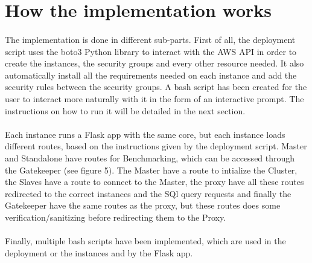 \pagebreak\section{How the implementation works} \label{T1}

\paragraph{}The implementation is done in different sub-parts. First of all, the deployment script uses the boto3 Python library to interact with the AWS API in order to create the instances, the security groups and every other resource needed. It also automatically install all the requirements needed on each instance and add the security rules between the security groups. A bash script has been created for the user to interact more naturally with it in the form of an interactive prompt. The instructions on how to run it will be detailed in the next section.

\paragraph{}Each instance runs a Flask app with the same core, but each instance loads different routes, based on the instructions given by the deployment script. Master and Standalone have routes for Benchmarking, which can be accessed through the Gatekeeper (see figure 5). The Master have a route to intialize the Cluster, the Slaves have a route to connect to the Master, the proxy have all these routes redirected to the correct instances and the SQl query requests and finally the Gatekeeper have the same routes as the proxy, but these routes does some verification/sanitizing before redirecting them to the Proxy.

\paragraph{}Finally, multiple bash scripts have been implemented, which are used in the deployment or the instances and by the Flask app.